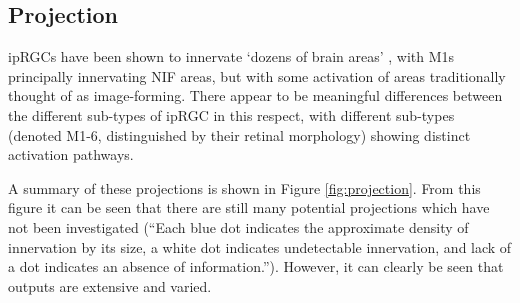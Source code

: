 \clearpage

\subsection{Projection}

\glspl{ipRGC} have been shown to innervate `dozens of brain areas' \citep{do_melanopsin_2019}, with M1s principally innervating \gls{NIF} areas, but with some activation of areas traditionally thought of as image-forming. There appear to be meaningful differences between the different sub-types of \gls{ipRGC} in this respect, with different sub-types (denoted M1-6, distinguished by their retinal morphology) showing distinct activation pathways. 

A summary of these projections is shown in Figure \ref{fig:projection}. From this figure it can be seen that there are still many potential projections which have not been investigated (``Each blue dot indicates the approximate density of innervation by its size, a white dot indicates undetectable innervation, and lack of a dot indicates an absence of information.''). However, it can clearly be seen that outputs are extensive and varied.


